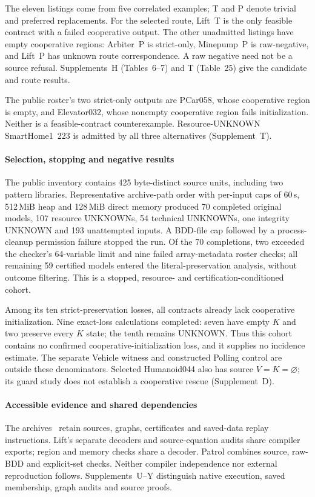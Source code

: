 

The eleven listings come from five correlated examples; T and P denote
trivial and preferred replacements. For the selected route, Lift~T is the
only feasible contract with a failed cooperative output. The other unadmitted listings have empty
cooperative regions: Arbiter~P is strict-only, Minepump~P is raw-negative,
and Lift~P has unknown route correspondence. A raw negative need not be a
source refusal. Supplements~H (Tables~6--7) and T (Table~25) give the
candidate and route results.

The public roster's two strict-only outputs are PCar058, whose
cooperative region is empty, and Elevator032, whose nonempty cooperative
region fails initialization. Neither is a feasible-contract counterexample.
Resource-UNKNOWN SmartHome1~223 is admitted by all three alternatives
(Supplement~T).

\paragraph{Selection, stopping and negative results}
The public inventory contains 425 byte-distinct source units, including
two pattern libraries. Representative archive-path order with per-input caps of 60\,s,
512\,MiB heap and 128\,MiB direct memory produced 70 completed original models, 107 resource UNKNOWNs, 54 technical
UNKNOWNs, one integrity UNKNOWN and 193 unattempted inputs. A BDD-file cap
followed by a process-cleanup permission failure stopped the run. Of the
70 completions, two exceeded the checker's 64-variable limit and nine
failed array-metadata roster checks; all remaining 59 certified models
entered the literal-preservation analysis, without outcome filtering.
This is a stopped, resource- and certification-conditioned cohort.

Among its ten strict-preservation losses, all contracts already lack
cooperative initialization. Nine exact-loss calculations completed: seven
have empty $K$ and two preserve every $K$ state; the tenth remains UNKNOWN.
Thus this cohort contains no confirmed cooperative-initialization loss,
and it supplies no incidence estimate. The separate Vehicle witness and
constructed Polling control are outside these denominators.
Selected Humanoid044 also has source $V=K=\varnothing$; its guard study
does not establish a cooperative rescue (Supplement~D).

\paragraph{Accessible evidence and shared dependencies}
The archives~\cite{savedartifact,newartifact,pendingartifact,diagnosticartifact,continuationartifact}
retain sources, graphs, certificates and saved-data replay instructions.
Lift's separate decoders and source-equation audits share compiler exports;
region and memory checks share a decoder. Patrol combines source, raw-BDD
and explicit-set checks. Neither compiler independence nor external
reproduction follows. Supplements~U--Y distinguish native execution,
saved membership, graph audits and source proofs.

